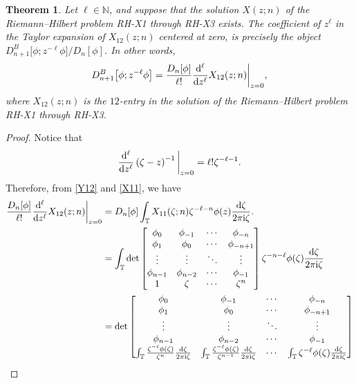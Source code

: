 \documentclass[pdftex]{sigma}
\numberwithin{equation}{section}
\newtheorem{Theorem}{Theorem}[section]
\newcommand{\N}{{\mathbb N}}
\newcommand{\T}{{\mathbb T}}
\newcommand{\ze}{\zeta}
\newcommand{\ii}{{\rm i}}
\newcommand{\dd}{{\rm d}}
\begin{document}
	\begin{Theorem}\label{thm border z^-l phi}
		Let $\ell \in \N$, and suppose that the solution $X(z;n)$ of the Riemann--Hilbert problem {\rm RH-X1} through {\rm RH-X3} exists. The coefficient of $z^{\ell}$ in the Taylor expansion of $X_{12}(z;n)$ centered at zero, is precisely the object $D^B_{n+1}\big[\phi;z^{-\ell}\phi\big]/D_n[\phi]$. In other words,
		\begin{equation*}
			D^B_{n+1}\big[\phi;z^{-\ell}\phi\big] = \frac{D_n[\phi]}{\ell!} \frac{\dd ^{\ell}}{\dd z^{\ell}}X_{12}(z;n) \bigg|_{z=0},
		\end{equation*}
		where $X_{12}(z;n)$ is the $12$-entry in the solution of the Riemann--Hilbert problem {\rm RH-X1} through {\rm RH-X3}.
	\end{Theorem}
	
	\begin{proof}
		Notice that
		\begin{equation*}
			\frac{\dd^{\ell}}{\dd z^{\ell}} \left( \ze - z \right)^{-1} \bigg|_{z=0} = \ell ! \ze^{-\ell-1}.
		\end{equation*}
		Therefore, from \eqref{Y12} and \eqref{X11}, we have
		\begin{equation*}
			\begin{split}
				\frac{D_n[\phi]}{\ell!} \frac{\dd ^{\ell}}{\dd z^{\ell}}X_{12}(z;n) \bigg|_{z=0} & = D_n[\phi] \int_{\T} X_{11}(\ze;n) \ze^{-\ell-n} \phi(z) \frac{\dd \ze}{2 \pi \ii \ze}. \\
				& = \int_{\T} \det \begin{bmatrix}
					\phi_0 & \phi_{-1} & \cdots & \phi_{-n} \\
					\phi_1 & \phi_{0} & \cdots & \phi_{-n+1} \\
					\vdots & \vdots & \ddots & \vdots \\
					\phi_{n-1} & \phi_{n-2} & \cdots & \phi_{-1} \\
					1 & \ze & \cdots & \ze^n
				\end{bmatrix} \ze^{-n-\ell} \phi(\ze) \frac{\dd \ze}{2 \pi \ii \ze} \\ & = \det \begin{bmatrix}
					\phi_0 & \phi_{-1} & \cdots & \phi_{-n} \\
					\phi_1 & \phi_0 & \cdots & \phi_{-n+1} \\
					\vdots & \vdots & \ddots & \vdots \\
					\phi_{n-1} & \phi_{n-2} & \cdots & \phi_{-1} \\
					\int_{\T} \frac{ \ze^{-\ell} \phi(\ze)}{\ze^{n}} \frac{\dd \ze}{2 \pi \ii \ze} & \int_{\T} \frac{\ze^{-\ell} \phi(\ze)}{\ze^{n-1}} \frac{\dd \ze}{2 \pi \ii \ze} & \cdots & \int_{\T} \ze^{-\ell} \phi(\ze) \frac{\dd \ze}{2 \pi \ii \ze}

\end{bmatrix}
\end{split}
\end{equation*}
\end{proof}
\end{document}
